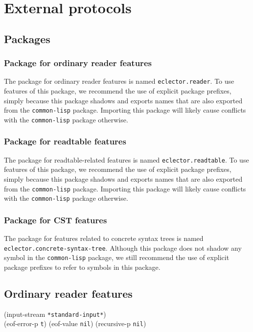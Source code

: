 \chapter{External protocols}

\section{Packages}

\subsection{Package for ordinary reader features}

The package for ordinary reader features is named
\texttt{eclector.reader}.  To use features of this package, we
recommend the use of explicit package prefixes, simply because this
package shadows and exports names that are also exported from the
\texttt{common-lisp} package.  Importing this package will likely
cause conflicts with the \texttt{common-lisp} package otherwise.

\subsection{Package for readtable features}

The package for readtable-related features is named
\texttt{eclector.readtable}.  To use features of this package, we
recommend the use of explicit package prefixes, simply because this
package shadows and exports names that are also exported from the
\texttt{common-lisp} package.  Importing this package will likely
cause conflicts with the \texttt{common-lisp} package otherwise.

\subsection{Package for CST features}

The package for features related to concrete syntax trees is named
\texttt{eclector.concrete-syntax-tree}.  Although this package does
not shadow any symbol in the \texttt{common-lisp} package, we still
recommend the use of explicit package prefixes to refer to symbols in
this package.

\section{Ordinary reader features}

 {\optional (input-stream \texttt{*standard-input*})\\
  (eof-error-p \texttt{t})
  (eof-value \texttt{nil})
  (recursive-p \texttt{nil})}

